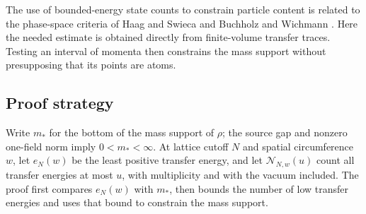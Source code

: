 The use of bounded-energy state counts to constrain particle content is
related to the phase-space criteria of Haag and Swieca
\cite{HaagSwieca1965} and Buchholz and Wichmann
\cite{BuchholzWichmann1986}. Here the needed estimate is obtained directly
from finite-volume transfer traces. Testing an interval of momenta then
constrains the mass support without presupposing that its points are atoms.

\subsection{Proof strategy}

Write $m_*$ for the bottom of the mass support of $\rho$; the source
gap and nonzero one-field norm imply $0<m_*<\infty$. At lattice cutoff
$N$ and spatial circumference $w$, let $e_N(w)$ be the least positive
transfer energy, and let $\mathcal N_{N,w}(u)$ count all transfer
energies at most $u$, with multiplicity and with the vacuum included.
The proof first compares $e_N(w)$ with $m_*$, then bounds the number
of low transfer energies and uses that bound to constrain the mass support.

